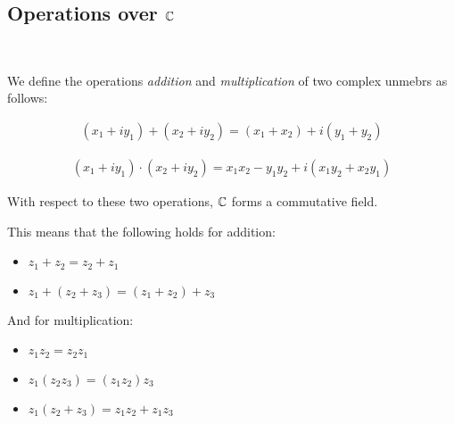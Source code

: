 \subsection{Operations over $\mathbb{C}$}\hfill\\\par
\noindent We define the operations \textit{addition} and \textit{multiplication} of two complex unmebrs as follows:
\par\bigskip
\begin{theo}{}
  \begin{equation*}
    \begin{gathered}
      (x_1+iy_1)+(x_2+iy_2) = (x_1+x_2)+i(y_1+y_2)
    \end{gathered}
  \end{equation*}
\end{theo}
\par\bigskip
\begin{theo}{}
  \begin{equation*}
    \begin{gathered}
      (x_1+iy_1)\cdot(x_2+iy_2) = x_1x_2-y_1y_2+i(x_1y_2+x_2y_1)
    \end{gathered}
  \end{equation*}
\end{theo}
\par\bigskip
\noindent With respect to these two operations, $\mathbb{C}$ forms a commutative field.
\par\bigskip
\noindent This means that the following holds for addition:\par
\begin{itemize}
  \item $z_1+z_2 = z_2+z_1$
  \item $z_1+(z_2+z_3) = (z_1+z_2) + z_3$
\end{itemize}
\par\bigskip
\noindent And for multiplication:\par
\begin{itemize}
  \item $z_1z_2 = z_2z_1$
  \item $z_1(z_2z_3) = (z_1z_2)z_3$
  \item $z_1(z_2+z_3) = z_1z_2+z_1z_3$
\end{itemize}
\newpage
